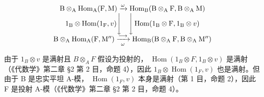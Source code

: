 \[
\begin{array}{c} \mathrm{B} \otimes_ {\mathrm{A}} \operatorname{Hom} _ {\mathrm{A}} (\mathrm{F}, \mathrm{M}) \xrightarrow {\omega} \operatorname{Hom} _ {\mathrm{B}} (\mathrm{B} \otimes_ {\mathrm{A}} \mathrm{F}, \mathrm{B} \otimes_ {\mathrm{A}} \mathrm{M}) \\ 1 _ {\mathrm{B}} \otimes \operatorname{Hom} (1 _ {\mathrm{F}}, v) \Bigg \downarrow \quad \Bigg \downarrow \operatorname{Hom} (1 _ {\mathrm{B}} \otimes \mathrm{F}, 1 _ {\mathrm{B}} \otimes v) \\ \mathrm{B} \otimes_ {\mathrm{A}} \operatorname{Hom} _ {\mathrm{A}} (\mathrm{F}, \mathrm{M} ^ {\prime \prime}) \xrightarrow [ \omega ]{\longrightarrow} \operatorname{Hom} _ {\mathrm{B}} (\mathrm{B} \otimes_ {\mathrm{A}} \mathrm{F}, \mathrm{B} \otimes_ {\mathrm{A}} \mathrm{M} ^ {\prime \prime}) \end{array}
\]

由于 \(1_{B} \otimes v\) 是满射且 \(B \otimes_{A} F\) 假设为投射的， \(\operatorname{Hom}(1_{B} \otimes F, 1_{B} \otimes v)\) 是满射（《代数学》第二章 §2 第 2 目，命题 4），因此 \(1_{B} \otimes \operatorname{Hom}(1_{F}, v)\) 也是满射。但由于 B 是忠实平坦 A-模， \(\operatorname{Hom}(1_{F}, v)\) 本身是满射（第 1 目，命题 2），因此 F 是投射 A-模（《代数学》第二章 §2 第 2 目，命题 4）。


